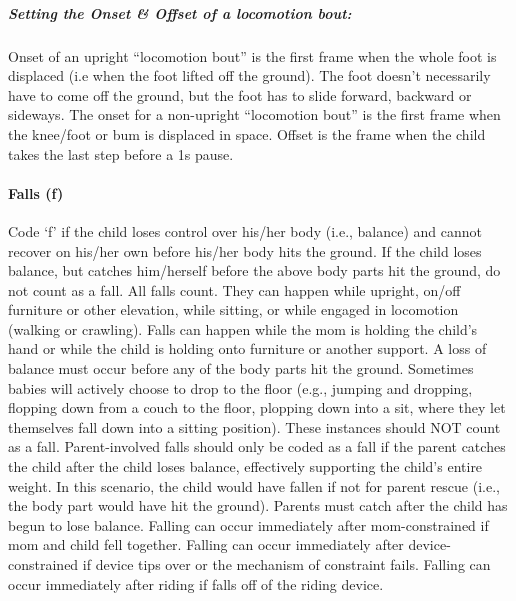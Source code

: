 \documentclass[
  12pt,
]{book}
\begin{document}
\hypertarget{setting-the-onset-offset-of-a-locomotion-bout}{%
\subparagraph*{Setting the Onset \& Offset of a locomotion bout:}\label{setting-the-onset-offset-of-a-locomotion-bout}}

Onset of an upright ``locomotion bout'' is the first frame when the whole foot is displaced (i.e when the foot lifted off the ground). The foot doesn't necessarily have to come off the ground, but the foot has to slide forward, backward or sideways. The onset for a non-upright ``locomotion bout'' is the first frame when the knee/foot or bum is displaced in space.
Offset is the frame when the child takes the last step before a 1s pause.

\hypertarget{child_fall}{%
\paragraph*{Falls (f)}\label{child_fall}}

Code `f' if the child loses control over his/her body (i.e., balance) and cannot recover on his/her own before his/her body hits the ground. If the child loses balance, but catches him/herself before the above body parts hit the ground, do not count as a fall.
All falls count. They can happen while upright, on/off furniture or other elevation, while sitting, or while engaged in locomotion (walking or crawling). Falls can happen while the mom is holding the child's hand or while the child is holding onto furniture or another support.
A loss of balance must occur before any of the body parts hit the ground. Sometimes babies will actively choose to drop to the floor (e.g., jumping and dropping, flopping down from a couch to the floor, plopping down into a sit, where they let themselves fall down into a sitting position). These instances should NOT count as a fall.
Parent-involved falls should only be coded as a fall if the parent catches the child after the child loses balance, effectively supporting the child's entire weight. In this scenario, the child would have fallen if not for parent rescue (i.e., the body part would have hit the ground). Parents must catch after the child has begun to lose balance.
Falling can occur immediately after mom-constrained if mom and child fell together. Falling can occur immediately after device-constrained if device tips over or the mechanism of constraint fails. Falling can occur immediately after riding if falls off of the riding device.
\end{document}
